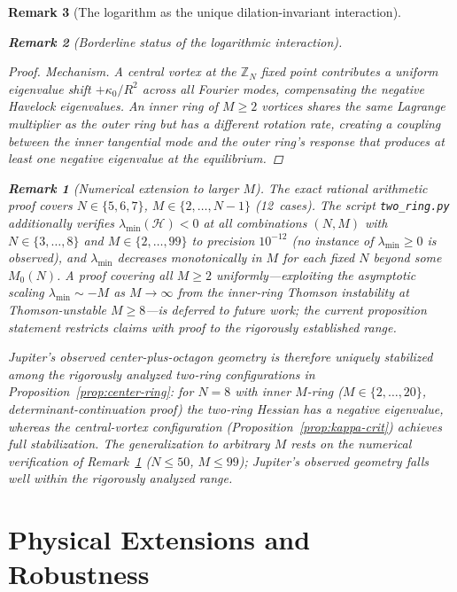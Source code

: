 \documentclass[12pt, a4paper]{article}
\newtheorem{remark}{Remark}[section]
\numberwithin{equation}{section}
\begin{document}
\begin{remark}[The logarithm as the unique dilation-invariant interaction]
\begin{remark}[Borderline status of the logarithmic interaction]
\begin{proof}
\emph{Mechanism.}  A central vortex at the $\mathbb{Z}_N$ fixed
point contributes a uniform eigenvalue shift $+\kappa_0/R^2$
across all Fourier modes, compensating the negative Havelock
eigenvalues.  An inner ring of $M \ge 2$ vortices shares
the same Lagrange multiplier as the outer ring but has a
\emph{different} rotation rate, creating a coupling between the
inner tangential mode and the outer ring's response that
produces at least one negative eigenvalue at the equilibrium.
\end{proof}

\begin{remark}[Numerical extension to larger $M$]
\label{rmk:center-ring-numerical}
The exact rational arithmetic proof covers $N \in \{5,6,7\}$,
$M \in \{2,\ldots,N{-}1\}$ (12~cases).  The script
\texttt{two\_ring.py} additionally verifies
$\lambda_{\min}(\mathcal{H}) < 0$ at all combinations
$(N, M)$ with $N \in \{3,\ldots,8\}$ and
$M \in \{2,\ldots,99\}$ to precision $10^{-12}$
(no instance of $\lambda_{\min} \ge 0$ is observed), and
$\lambda_{\min}$ decreases monotonically in $M$ for each
fixed $N$ beyond some $M_0(N)$.  A proof covering
all $M \ge 2$ uniformly---exploiting the asymptotic
scaling $\lambda_{\min} \sim -M$ as $M \to \infty$ from the
inner-ring Thomson instability at Thomson-unstable
$M \ge 8$---is deferred to future work; the current
proposition statement restricts claims with proof to the
rigorously established range.
\end{remark}

\noindent
Jupiter's observed center-plus-octagon geometry is therefore
\emph{uniquely stabilized} among the rigorously analyzed two-ring
configurations in Proposition~\ref{prop:center-ring}: for
$N = 8$ with inner $M$-ring ($M \in \{2, \ldots, 20\}$,
determinant-continuation proof) the two-ring Hessian has a negative
eigenvalue, whereas the central-vortex configuration
(Proposition~\ref{prop:kappa-crit}) achieves full stabilization.
The generalization to arbitrary $M$ rests on the numerical
verification of Remark~\ref{rmk:center-ring-numerical}
($N \le 50$, $M \le 99$); Jupiter's observed geometry falls well
within the rigorously analyzed range.



\part{Physical Extensions and Robustness}
\label{part:extensions}


\end{remark}
\end{remark}
\end{document}
